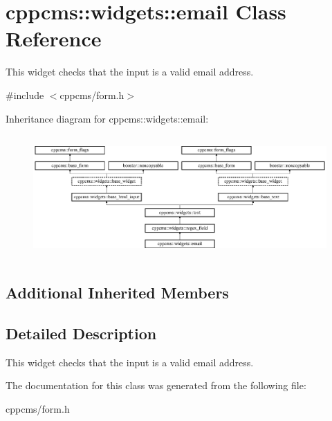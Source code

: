 \section{cppcms\+:\+:widgets\+:\+:email Class Reference}
\label{classcppcms_1_1widgets_1_1email}


This widget checks that the input is a valid email address.  




{\ttfamily \#include $<$cppcms/form.\+h$>$}

Inheritance diagram for cppcms\+:\+:widgets\+:\+:email\+:\begin{figure}[H]
\begin{center}
\leavevmode
\includegraphics[height=4.734299cm]{classcppcms_1_1widgets_1_1email}
\end{center}
\end{figure}
\subsection*{Additional Inherited Members}


\subsection{Detailed Description}
This widget checks that the input is a valid email address. 

The documentation for this class was generated from the following file\+:\begin{DoxyCompactItemize}
\item 
cppcms/form.\+h\end{DoxyCompactItemize}
